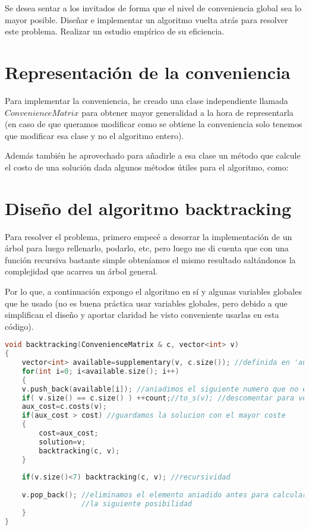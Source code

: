\documentclass[11pt]{article}
\begin{document}
Se desea sentar a los invitados de forma que el nivel de conveniencia global sea lo mayor posible. Diseñar e implementar un algoritmo vuelta atrás para resolver este problema. Realizar un estudio empírico de su eficiencia.

\section{Representación de la conveniencia}

Para implementar la conveniencia, he creado una clase independiente llamada $ConvenienceMatrix$ para obtener mayor generalidad a la hora de representarla (en caso de que queramos modificar como se obtiene la conveniencia solo tenemos que modificar esa clase y no el algoritmo entero).

Además también he aprovechado para añadirle a esa clase un método que calcule el costo de una solución dada algunos métodos útiles para el algoritmo, como:

\section{Diseño del algoritmo backtracking}

Para resolver el problema, primero empecé a desorrar la implementación de un árbol para luego rellenarlo, podarlo, etc, pero luego me di cuenta que con una función recursiva bastante simple obteníamos el mismo resultado saltándonos la complejidad que acarrea un árbol general.

Por lo que, a continuación expongo el algoritmo en sí y algunas variables globales que he usado (no es buena práctica usar variables globales, pero debido a que simplifican el diseño y aportar claridad he visto conveniente usarlas en esta código).

\begin{lstlisting}[language=C++, caption=Algoritmo backtracking]
void backtracking(ConvenienceMatrix & c, vector<int> v)
{
	vector<int> available=supplementary(v, c.size()); //definida en 'auxliar.cpp'
	for(int i=0; i<available.size(); i++)
	{
	v.push_back(available[i]); //aniadimos el siguiente numero que no este ya en la solucion
	if( v.size() == c.size() ) ++count;//to_s(v); //descomentar para ver todas las posibilidades
	aux_cost=c.costs(v);
	if(aux_cost > cost) //guardamos la solucion con el mayor coste
	{
		cost=aux_cost;
		solution=v;
		backtracking(c, v);
	}
	
	if(v.size()<7) backtracking(c, v); //recursividad
	
	v.pop_back(); //eliminamos el elemento aniadido antes para calcular
				  //la siguiente posibilidad
	}
}
\end{lstlisting}
\end{document}

